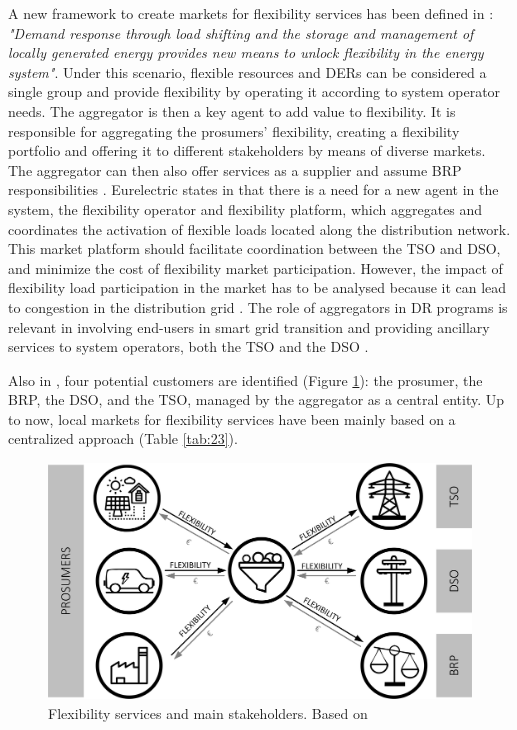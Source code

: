 A new framework to create markets for flexibility services has been defined in \cite{Ulbig2015,USEFFoundation2015a}: \textit{"Demand response through load shifting and the storage and management of locally generated energy provides new means to unlock flexibility in the energy system"}. Under this scenario, flexible resources and DERs can be considered a single group and provide flexibility by operating it according to system operator needs. The aggregator is then a key agent to add value to flexibility. It is responsible for aggregating the prosumers' flexibility, creating a flexibility portfolio and offering it to different stakeholders by means of diverse markets. The aggregator can then also offer services as a supplier and assume BRP responsibilities \cite{MarketDesignENTSOE}. Eurelectric states in \cite{mandatova2014flexibility} that there is a need for a new agent in the system, the flexibility operator and flexibility platform, which aggregates and coordinates the activation of flexible loads located along the distribution network. This market platform should facilitate coordination between the TSO and DSO, and minimize the cost of flexibility market participation. However, the impact of flexibility load participation in the market has to be analysed because it can lead to congestion in the distribution grid \cite{esterl2016impact}. The role of aggregators in DR programs is relevant in involving end-users in smart grid transition and providing ancillary services to system operators, both the TSO and the DSO \cite{Carreiro2017}.

Also in \cite{USEFFoundation2015a}, four potential customers are identified (Figure \ref{figure210}): the prosumer, the BRP, the DSO, and the TSO, managed by the aggregator as a central entity. Up to now, local markets for flexibility services have been mainly based on a centralized approach (Table \ref{tab:23}).

\begin{figure}[h]
	\centering
	\includegraphics[width=0.9\columnwidth ]{ChapterIntro/Figures/Figure2.10.jpg}
		\caption{Flexibility services and main stakeholders. Based on \cite{USEFFoundation2015a} }  
	\label{figure210}
\end{figure}

